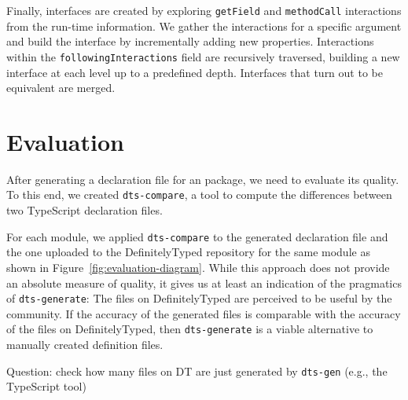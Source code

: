 \documentclass[english,cleveref,autoref,submission]{programming}
\newenvironment{changethis}{%
  \begin{tcolorbox}[breakable,notitle,boxrule=0pt,colback=blue!20,colframe=blue!20]}{%
  \end{tcolorbox}}
\newcommand{\figref}[1]{Figure~\ref{#1}}
\begin{document}
Finally, interfaces are created by exploring \texttt{getField} and \texttt{methodCall} interactions from the run-time information. We
gather the interactions for a specific argument and build the
interface by incrementally adding new properties. Interactions within
the \texttt{followingInteractions} field are recursively traversed,
building a new interface at each level up to a predefined depth. Interfaces that turn out
to be equivalent are merged.

\section{Evaluation}
\label{sec:dts-generate-evaluation}
After generating a declaration file for an \NPM{} package, we need to
evaluate its quality. To this end, we created \texttt{dts-compare}, a tool to compute the
differences between two TypeScript declaration files.

For each module, we applied \texttt{dts-compare} to the generated declaration file and the
one uploaded to the DefinitelyTyped repository for the same module as shown in
\figref{fig:evaluation-diagram}. While this approach does not provide an absolute measure
of quality, it gives us at least an indication of the pragmatics of \texttt{dts-generate}:
The files on DefinitelyTyped are perceived to be useful by the community. If the accuracy
of the generated files is comparable with the accuracy of the files on DefinitelyTyped,
then \texttt{dts-generate} is a viable alternative to manually created definition files.

\begin{changethis}
  Question: check how many files on DT are just generated by \texttt{dts-gen} (e.g., the TypeScript tool)
\end{changethis}
 
\end{document}
